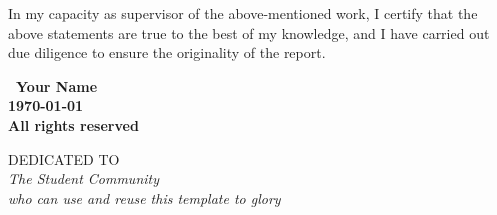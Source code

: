 \vspace{20mm}

 \qquad

\vspace{20mm}

\noindent In my capacity as supervisor of the above-mentioned work, I certify
that the above statements are true to the best of my knowledge, and
I have carried out due diligence to ensure the originality of the
report.

\vspace{20mm}

 \qquad


\blankpage

\vspace*{\fill}
\begin{center}
\large\bf \textcopyright \ Your Name\\
\large\bf \monthyeardate\today\\
\large\bf All rights reserved
\end{center}
\vspace*{\fill}
\thispagestyle{empty}


\blankpage

\vspace*{\fill}
\begin{center}
DEDICATED TO \\[2em]
\Large\it The Student Community\\[2em]
\Large\it who can use and reuse this template to glory
\end{center}
\vspace*{\fill}
\thispagestyle{empty}


%


